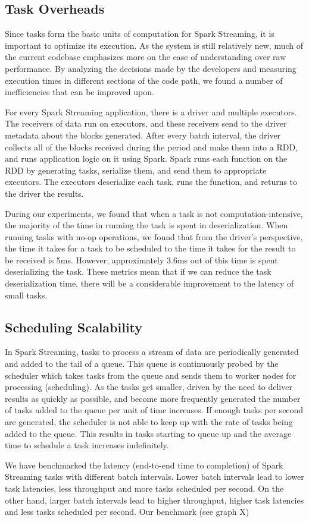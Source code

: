 \subsection{Task Overheads}
Since tasks form the basic units of computation for Spark Streaming, it is important to optimize its execution. As the system is still relatively new, much of the current codebase emphasizes more on the ease of understanding over raw performance. By analyzing the decisions made by the developers and measuring execution times in different sections of the code path, we found a number of inefficiencies that can be improved upon.

For every Spark Streaming application, there is a driver and multiple executors. The receivers of data run on executors, and these receivers send to the driver metadata about the blocks generated. After every batch interval, the driver collects all of the blocks received during the period and make them into a RDD, and runs application logic on it using Spark. Spark runs each function on the RDD by generating tasks, serialize them, and send them to appropriate executors. The executors deserialize each task, runs the function, and returns to the driver the results.

During our experiments, we found that when a task is not computation-intensive, the majority of the time in running the task is spent in deserialization. When running tasks with no-op operations, we found that from the driver's perspective, the time it takes for a task to be scheduled to the time it takes for the result to be received is 5ms. However, approximately 3.6ms out of this time is spent deserializing the task. These metrics mean that if we can reduce the task deserialization time, there will be a considerable improvement to the latency of small tasks.


\subsection{Scheduling Scalability}

In Spark Streaming, tasks to process a stream of data are periodically generated and added to the tail of a queue. This queue is continuously probed by the scheduler which takes tasks from the queue and sends them to worker nodes for processing (scheduling).
As the tasks get smaller, driven by the need to deliver results as quickly as possible, and become more frequently generated the number of tasks added to the queue per unit of time increases. If enough tasks per second are generated, the scheduler is not able to keep up with the rate of tasks being added to the queue. This results in tasks starting to queue up and the average time to schedule a task increases indefinitely.

We have benchmarked the latency (end-to-end time to completion) of Spark Streaming tasks with different batch intervals. Lower batch intervals lead to lower task latencies, less throughput and more tasks scheduled per second. On the other hand, larger batch intervals lead to higher throughput, higher task latencies and less tasks scheduled per second. Our benchmark (see graph X)  

